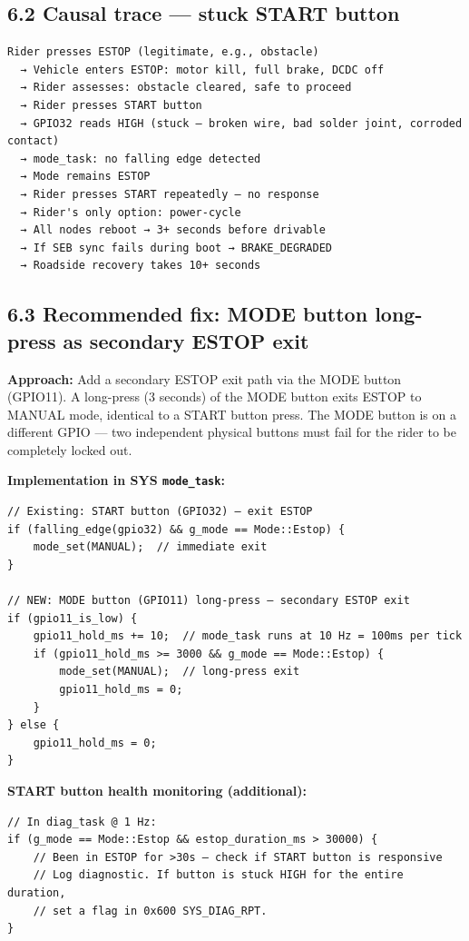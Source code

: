 \documentclass[12pt,a4paper,oneside]{report}
\begin{document}
\subsection{6.2 Causal trace --- stuck START
button}\label{causal-trace-stuck-start-button}

\begin{verbatim}
Rider presses ESTOP (legitimate, e.g., obstacle)
  → Vehicle enters ESTOP: motor kill, full brake, DCDC off
  → Rider assesses: obstacle cleared, safe to proceed
  → Rider presses START button
  → GPIO32 reads HIGH (stuck — broken wire, bad solder joint, corroded contact)
  → mode_task: no falling edge detected
  → Mode remains ESTOP
  → Rider presses START repeatedly — no response
  → Rider's only option: power-cycle
  → All nodes reboot → 3+ seconds before drivable
  → If SEB sync fails during boot → BRAKE_DEGRADED
  → Roadside recovery takes 10+ seconds
\end{verbatim}

\subsection{6.3 Recommended fix: MODE button long-press as secondary ESTOP
exit}\label{recommended-fix-mode-button-long-press-as-secondary-estop-exit}

\textbf{Approach:} Add a secondary ESTOP exit path via the MODE button (GPIO11).
A long-press (3 seconds) of the MODE button exits ESTOP to MANUAL mode,
identical to a START button press. The MODE button is on a different GPIO ---
two independent physical buttons must fail for the rider to be completely locked
out.

\textbf{Implementation in SYS \texttt{mode\_task}:}

\begin{verbatim}
// Existing: START button (GPIO32) — exit ESTOP
if (falling_edge(gpio32) && g_mode == Mode::Estop) {
    mode_set(MANUAL);  // immediate exit
}

// NEW: MODE button (GPIO11) long-press — secondary ESTOP exit
if (gpio11_is_low) {
    gpio11_hold_ms += 10;  // mode_task runs at 10 Hz = 100ms per tick
    if (gpio11_hold_ms >= 3000 && g_mode == Mode::Estop) {
        mode_set(MANUAL);  // long-press exit
        gpio11_hold_ms = 0;
    }
} else {
    gpio11_hold_ms = 0;
}
\end{verbatim}

\textbf{START button health monitoring (additional):}

\begin{verbatim}
// In diag_task @ 1 Hz:
if (g_mode == Mode::Estop && estop_duration_ms > 30000) {
    // Been in ESTOP for >30s — check if START button is responsive
    // Log diagnostic. If button is stuck HIGH for the entire duration,
    // set a flag in 0x600 SYS_DIAG_RPT.
}
\end{verbatim}
\end{document}
